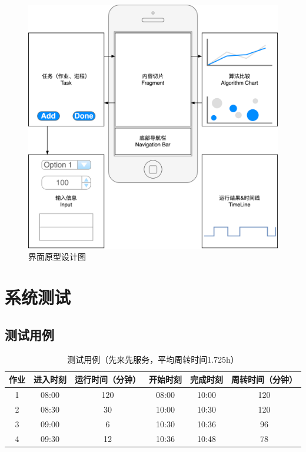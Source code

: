 \documentclass[UTF8]{ctexart}
\begin{document}
\begin{figure}[htbp]
    \centering
    \includegraphics[scale=0.09]{i-prototype.png}
    \caption{界面原型设计图}
\end{figure}

\section{系统测试}

\subsection{测试用例}

\begin{table}[htbp]
    \caption{测试用例（先来先服务，平均周转时间1.725h）}
    \centering
    \begin{tabular}{cccccc}
        \toprule
        作业 & 进入时刻 & 运行时间（分钟） & 开始时刻 & 完成时刻 & 周转时间（分钟） \\
        \midrule
        1    & 08:00    & 120              & 08:00    & 10:00    & 120              \\
        2    & 08:30    & 30               & 10:00    & 10:30    & 120              \\
        3    & 09:00    & 6                & 10:30    & 10:36    & 96               \\
        4    & 09:30    & 12               & 10:36    & 10:48    & 78               \\
        \bottomrule
    \end{tabular}
    \qquad
\end{table}
\end{document}
